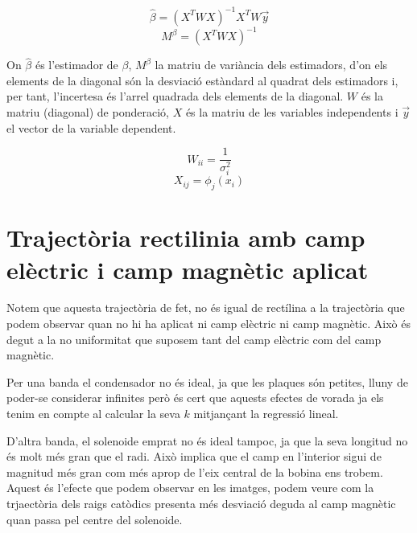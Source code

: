 \documentclass[11pt]{article}
\begin{document}
 \begin{equation}
     \hat{\beta} = (X^TWX)^{-1}X^TW\vec{y}
 \end{equation}
 \begin{equation}
     M^\beta = (X^TWX)^{-1}
 \end{equation}
 
 On $\hat{\beta}$ és l'estimador de $\beta$, $M^\beta$ la matriu de variància dels estimadors, d'on els elements de la diagonal són la desviació estàndard al quadrat dels estimadors i, per tant, l'incertesa és l'arrel quadrada dels elements de la diagonal. $W$ és la matriu (diagonal) de ponderació, $X$ és la matriu de les variables independents i $\vec{y}$ el vector de la variable dependent.
 
 \begin{equation}
     W_{ii} = \frac{1}{\sigma_i^2}
 \end{equation}
 \begin{equation}
     X_{ij} = \phi_j(x_i)
 \end{equation}

\section{Trajectòria rectilinia amb camp elèctric i camp magnètic aplicat}\label{sec: traj_no_rect}

Notem que aquesta trajectòria de fet, no és igual de rectílina a la trajectòria que podem observar quan no hi ha aplicat ni camp elèctric ni camp magnètic. Això és degut a la no uniformitat que suposem tant del camp elèctric com del camp magnètic. 

Per una banda el condensador no és ideal, ja que les plaques són petites, lluny de poder-se considerar infinites però és cert que aquests efectes de vorada ja els tenim en compte al calcular la seva $k$ mitjançant la regressió lineal. 

D'altra banda, el solenoide emprat no és ideal tampoc, ja que la seva longitud no és molt més gran que el radi. Això implica que el camp en l'interior sigui de magnitud més gran com més aprop de l'eix central de la bobina ens trobem. Aquest és l'efecte que podem observar en les imatges, podem veure com la trjaectòria dels raigs catòdics presenta més desviació deguda al camp magnètic quan passa pel centre del solenoide.
\end{document}
